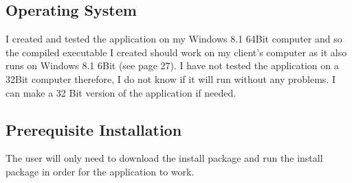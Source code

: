 \subsection{Operating System}

I created and tested the application on my Windows 8.1 64Bit computer and so the compiled executable I created should work on my client's computer as it also runs on Windows 8.1 6Bit (see page 27). I have not tested the application on a 32Bit computer therefore, I do not know if it will run without any problems. I can make a 32 Bit version of the application if needed.

\subsection{Prerequisite Installation}

The user will only need to download the install package and run the install package in order for the application to work.

